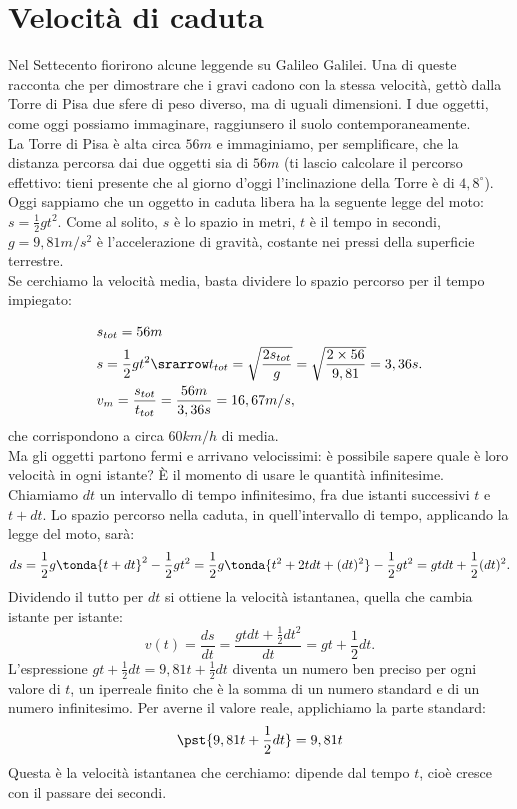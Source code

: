 \section{Velocità di caduta}
\label{04_diffvelcaduta}
Nel Settecento fiorirono alcune leggende su Galileo Galilei. Una di queste 
racconta che per dimostrare che i gravi cadono con la stessa velocità, 
gettò dalla Torre di Pisa due sfere di peso diverso, ma di uguali 
dimensioni. 
I due oggetti, come oggi possiamo immaginare, raggiunsero il suolo 
contemporaneamente.\\
La Torre di Pisa è alta circa $56m$ e immaginiamo, per semplificare, che la 
distanza percorsa dai due oggetti sia di $56m$ (ti lascio calcolare il 
percorso effettivo: tieni presente che al giorno d'oggi l'inclinazione della 
Torre è di $4,8^\circ$).\\
Oggi sappiamo che un oggetto in caduta libera ha la seguente legge del moto:
\(s=\frac{1}{2}gt^2\). Come al solito, $s$ è lo spazio in metri, $t$ è il 
tempo in secondi, $g=9,81 m/s^2$ è l'accelerazione di gravità, costante nei
pressi della superficie terrestre.\\
Se cerchiamo la velocità media, basta dividere lo spazio percorso per il 
tempo impiegato:

\begin{align*}
 & s_{tot} = 56m\\
 & s =\frac{1}{2}gt^2 \srarrow t_{tot}= \sqrt{\frac{2s_{tot}}{g}}=
 \sqrt{\frac{2\times 56}{9,81}}=3,36 s.\\
 & v_m= \frac{s_{tot}}{t_{tot}}=\frac{56 m}{3,36 s}=16,67 m/s,
\end{align*}
che corrispondono a circa \(60 km/h\) di media.\\
Ma gli oggetti partono fermi e arrivano velocissimi: 
è possibile sapere quale è loro velocità in ogni istante? È il momento
di usare le quantità infinitesime.\\
Chiamiamo $dt$ un intervallo di tempo infinitesimo, fra due istanti successivi
$t$ e $t+dt$.
Lo spazio percorso nella caduta, in quell'intervallo di tempo, applicando 
la legge del moto, sarà:
\[
 ds=\frac{1}{2}g\tonda{t+dt}^2-\frac{1}{2}gt^2=
 \frac{1}{2}g\tonda{t^2+2tdt+(dt)^2}-\frac{1}{2}gt^2=
 gtdt+\frac{1}{2}(dt)^2. 
\]
Dividendo il tutto per \(dt\) si ottiene la velocità istantanea, quella che 
cambia istante per istante:
\[
 v(t)=\frac{ds}{dt}=\frac{gtdt+\frac{1}{2}dt^2}{dt}=gt+\frac{1}{2}dt.
\]
L'espressione $gt+\frac{1}{2}dt=9,81t+\frac{1}{2}dt$ diventa un numero ben
preciso per ogni valore di $t$, un iperreale finito che è la
somma di un numero standard e di un numero infinitesimo. 
Per averne il valore reale, applichiamo la parte standard:
\[
 \pst{9,81t+\frac{1}{2}dt}=9,81t
\]
Questa è la velocità istantanea che cerchiamo: dipende dal tempo $t$,
cioè cresce con il passare dei secondi. 

